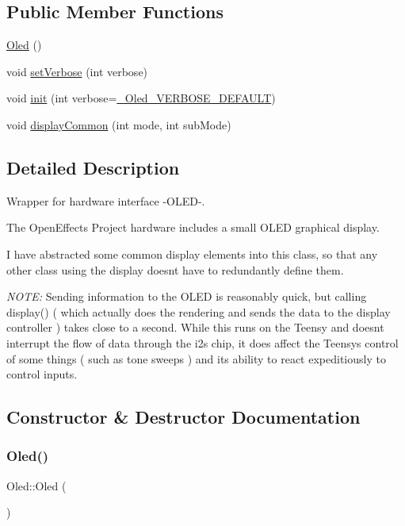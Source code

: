 \subsection*{Public Member Functions}
\begin{DoxyCompactItemize}
\item 
\mbox{\hyperlink{class_oled_a32b8b208af4d53455ff88c519eff75da}{Oled}} ()
\item 
void \mbox{\hyperlink{class_oled_ac98607fd013045f3e1b2d015cc1ddb73}{set\+Verbose}} (int verbose)
\item 
void \mbox{\hyperlink{class_oled_a36f0818a7144c6983ae765a7a0659a70}{init}} (int verbose=\mbox{\hyperlink{_oled_8h_a709eafcdb5f29b4e09e40afd3797bf1f}{\+\_\+\+Oled\+\_\+\+V\+E\+R\+B\+O\+S\+E\+\_\+\+D\+E\+F\+A\+U\+LT}})
\item 
void \mbox{\hyperlink{class_oled_a466ecce521b09ac6470aae9836b2f806}{display\+Common}} (int mode, int sub\+Mode)
\end{DoxyCompactItemize}


\subsection{Detailed Description}
Wrapper for hardware interface -\/\+O\+L\+E\+D-\/. 

The Open\+Effects Project hardware includes a small O\+L\+ED graphical display.

I have abstracted some common display elements into this class, so that any other class using the display doesn\textquotesingle{}t have to redundantly define them.

{\itshape N\+O\+TE\+:} Sending information to the O\+L\+ED is reasonably quick, but calling display() ( which actually does the rendering and sends the data to the display controller ) takes close to a second. While this runs on the Teensy and doesn\textquotesingle{}t interrupt the flow of data through the i2s chip, it does affect the Teensy\textquotesingle{}s control of some things ( such as tone sweeps ) and its ability to react expeditiously to control inputs. 

\subsection{Constructor \& Destructor Documentation}
\mbox{\label{class_oled_a32b8b208af4d53455ff88c519eff75da}} 
\subsubsection{\texorpdfstring{Oled()}{Oled()}}
{\footnotesize\ttfamily Oled\+::\+Oled (\begin{DoxyParamCaption}{ }\end{DoxyParamCaption})}


